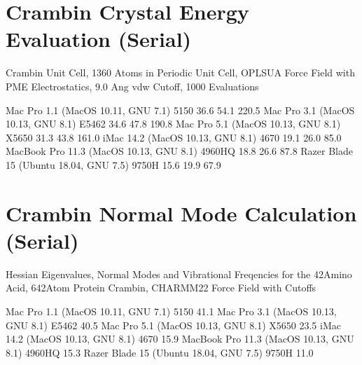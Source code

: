 \documentclass[letterpaper,11pt,english]{sphinxmanual}
\begin{document}
\section{Crambin Crystal Energy Evaluation (Serial)}
\label{\detokenize{text/benchmarks:crambin-crystal-energy-evaluation-serial}}
Crambin Unit Cell, 1360 Atoms in Periodic Unit Cell, OPLS\sphinxhyphen{}UA Force Field with PME Electrostatics, 9.0 Ang vdw Cutoff, 1000 Evaluations


\begin{sphinxVerbatim}[commandchars=\\\{\}]
Mac Pro 1.1 (MacOS 10.11, GNU 7.1)             5150        36.6         54.1       220.5
Mac Pro 3.1 (MacOS 10.13, GNU 8.1)            E5462        34.6         47.8       190.8
Mac Pro 5.1 (MacOS 10.13, GNU 8.1)            X5650        31.3         43.8       161.0
iMac 14.2 (MacOS 10.13, GNU 8.1)               4670        19.1         26.0        85.0
MacBook Pro 11.3 (MacOS 10.13, GNU 8.1)      4960HQ        18.8         26.6        87.8
Razer Blade 15 (Ubuntu 18.04, GNU 7.5)        9750H        15.6         19.9        67.9
\end{sphinxVerbatim}


\section{Crambin Normal Mode Calculation (Serial)}
\label{\detokenize{text/benchmarks:crambin-normal-mode-calculation-serial}}
Hessian Eigenvalues, Normal Modes and Vibrational Freqencies for the 42\sphinxhyphen{}Amino Acid, 642\sphinxhyphen{}Atom Protein Crambin, CHARMM\sphinxhyphen{}22 Force Field with Cutoffs


\begin{sphinxVerbatim}[commandchars=\\\{\}]
Mac Pro 1.1 (MacOS 10.11, GNU 7.1)             5150                41.1
Mac Pro 3.1 (MacOS 10.13, GNU 8.1)            E5462                40.5
Mac Pro 5.1 (MacOS 10.13, GNU 8.1)            X5650                23.5
iMac 14.2 (MacOS 10.13, GNU 8.1)               4670                15.9
MacBook Pro 11.3 (MacOS 10.13, GNU 8.1)      4960HQ                15.3
Razer Blade 15 (Ubuntu 18.04, GNU 7.5)        9750H                11.0
\end{sphinxVerbatim}
\end{document}

